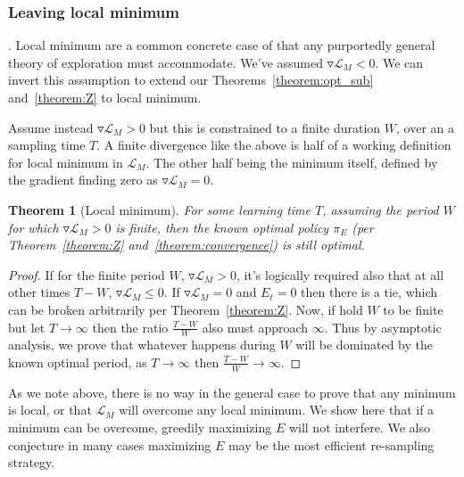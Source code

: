 \documentclass[9pt,twocolumn,twoside]{pnas-new}
\newtheorem{theorem}{Theorem}
\begin{document}
\subsubsection*{Leaving local minimum}.
Local minimum are a common concrete case of that any purportedly general theory of exploration must accommodate. We've assumed $\triangledown \mathcal{L}_M < 0$. We can invert this assumption to extend our Theorems~\ref{theorem:opt_sub} and~\ref{theorem:Z} to local minimum. 

Assume instead $\triangledown \mathcal{L}_M > 0$ but this is constrained to a finite duration $W$, over an a sampling time $T$. A finite divergence like the above is half of a working definition for local minimum in $\mathcal{L}_M$. The other half being the minimum itself, defined by the gradient finding zero as $\triangledown \mathcal{L}_M = 0$.

\begin{theorem}[Local minimum] \label{theorem:local_min}
    For some learning time $T$, assuming the period $W$ for which $\triangledown \mathcal{L}_M > 0$ is finite, then the known optimal policy $\pi_E$ (per Theorem~\ref{theorem:Z} and~\ref{theorem:convergence}) is still optimal.
\end{theorem}
\begin{proof}
If for the finite period $W$, $\triangledown \mathcal{L}_M > 0$, it's logically required also that at all other times $T - W$, $\triangledown \mathcal{L}_M \leq 0$.  If $\triangledown \mathcal{L}_M = 0$ and $E_t = 0$ then there is a tie, which can be broken arbitrarily per Theorem~\ref{theorem:Z}. Now, if hold $W$ to be finite but let $T \rightarrow \infty$ then the ratio $\frac{T - W}{W}$ also must approach $\infty$. Thus by asymptotic analysis, we prove that whatever happens during $W$ will be dominated by the known optimal period, as $T \rightarrow \infty$ then $\frac{T - W}{W} \rightarrow \infty$.
\end{proof}

As we note above, there is no way in the general case to prove that any minimum is local, or that $\mathcal{L}_M$ will overcome any local minimum. We show here that if a minimum can be overcome, greedily maximizing $E$ will not interfere. We also conjecture in many cases maximizing $E$ may be the most efficient re-sampling strategy. 

\end{document}
